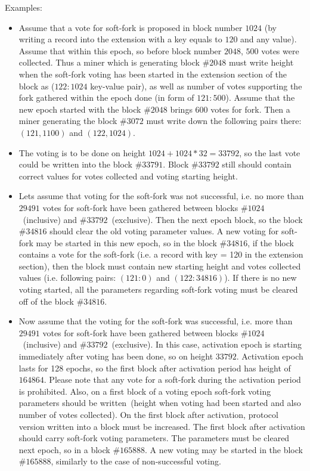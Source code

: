 Examples:

\begin{itemize}
    \item{} Assume that a vote for soft-fork is proposed in block number $1024$ (by writing a record into the extension
            with a key equals to $120$ and any value). Assume that within this epoch,
            so before block number $2048$, $500$ votes were collected. Thus a miner which is generating block
            $\#2048$ must write height when the soft-fork voting has been started in the extension section of the block
            as ($122: 1024$ key-value pair), as well as number of votes supporting the fork gathered within the epoch
            done (in form of $121: 500$). Assume that the new epoch started with the block $\#2048$ brings 600 votes for
            fork. Then a miner generating the block $\#3072$ must write down the following pairs there: $(121, 1100)$ and
            $(122, 1024)$.
    \item{} The voting is to be done on height $1024 + 1024*32 = 33792$, so the last vote could be written into the
            block $\#33791$. Block $\#33792$ still should contain correct values for votes collected and voting starting
            height.
    \item{} Lets assume that voting for the soft-fork was not successful, i.e. no more than $29491$ votes for soft-fork
            have been gathered between blocks $\#1024$~(inclusive) and $\#33792$~(exclusive). Then the next epoch block,
            so the block $\#34816$ should clear the old voting parameter values. A new voting for soft-fork may be
            started in this new epoch, so in the block $\#34816$, if the block contains a vote for the soft-fork
            (i.e. a record with key = 120 in the extension section), then the block must contain new starting height
            and votes collected values (i.e. following pairs: $(121: 0)$ and $(122: 34816)$). If there is no new voting
            started, all the parameters regarding soft-fork voting must be cleared off of the block $\#34816$.
    \item{} Now assume that the voting for the soft-fork was successful, i.e. more than $29491$ votes for soft-fork
            have been gathered between blocks $\#1024$~(inclusive) and $\#33792$~(exclusive). In this case, activation
            epoch is starting immediately after voting has been done, so on height $33792$. Activation epoch lasts for
            128 epochs, so the first block after activation period has height of $164864$. Please note that any vote
            for a soft-fork during the activation period is prohibited. Also, on a first block of a voting epoch
            soft-fork voting parameters should be written~(height when voting had been started and also number of votes
            collected). On the first block after activation, protocol version written into a block must be increased.
            The first block after activation should carry soft-fork voting parameters. The parameters must be cleared
            next epoch, so in a block $\#165888$. A new voting may be started in the block $\#165888$, similarly to the
            case of non-successful voting.
\end{itemize}
